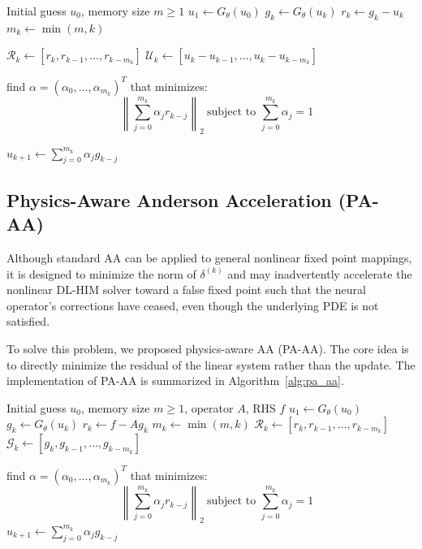 \documentclass[11pt]{article}
\begin{document}
\begin{algorithm}[h!]
    \caption{Standard AA for DL-HIM}
    \label{alg:aa}
    \begin{algorithmic}[1]
        \Require Initial guess $u_0$, memory size $m \ge 1$
        \State $u_1 \gets G_\theta(u_0)$
        \State $g_k \gets G_\theta(u_k)$
        \State $r_k \gets g_k - u_k$    
        \State $m_k \gets \min(m, k)$

        \State $\mathcal{R}_k \gets [r_k, r_{k-1}, \dots, r_{k-m_k}]$
        \State $\mathcal U_k \gets [u_k - u_{k-1}, \dots, u_k - u_{k-m_k}]$

        \State find $\alpha = (\alpha_0, \dots, \alpha_{m_k})^T$ that minimizes:
        $$
            \quad \left\| \sum_{j=0}^{m_k} \alpha_j r_{k-j} \right\|_2 \
            \text{subject to } \sum_{j=0}^{m_k} \alpha_j = 1
        $$

        \State $u_{k+1} \gets \sum_{j=0}^{m_k} \alpha_j g_{k-j}$
        \EndFor
    \end{algorithmic}
\end{algorithm}

\subsection{Physics-Aware Anderson Acceleration (PA-AA)}
Although standard AA can be applied to general nonlinear fixed point mappings, it is designed to minimize the norm of $\delta^{(k)}$ and may inadvertently accelerate the nonlinear DL-HIM solver toward a false fixed point such that the neural operator's corrections have ceased, even though the underlying PDE is not satisfied.

To solve this problem, we proposed physics-aware AA (PA-AA). The core idea is to directly minimize the residual of the linear system rather than the update. The implementation of PA-AA is summarized in Algorithm~\ref{alg:pa_aa}.
\begin{algorithm}[h!]
    \caption{PA-AA for DL-HIM}\label{alg:pa_aa}
    \begin{algorithmic}[1]
        \Require Initial guess $u_0$, memory size $m \ge 1$, operator $A$, RHS $f$
        \State $u_1 \gets G_\theta(u_0)$
        \State $g_k \gets G_\theta(u_k)$
        \State $r_k \gets f - A g_k$    
        \State $m_k \gets \min(m, k)$
        \State $\mathcal{R}_k \gets [r_k, r_{k-1},\dots, r_{k-m_k}]$
        \State $\mathcal{G}_k \gets [g_k, g_{k-1}, \dots, g_{k-m_k}]$

        \State find $\alpha = (\alpha_0, \dots, \alpha_{m_k})^T$ that minimizes:
        $$
            \quad \left\| \sum_{j=0}^{m_k} \alpha_j r_{k-j} \right\|_2 \
            \text{subject to } \sum_{j=0}^{m_k} \alpha_j = 1
        $$
        \State $u_{k+1} \gets \sum_{j=0}^{m_k} \alpha_j g_{k-j}$
        \EndFor
    \end{algorithmic}
\end{algorithm}
\end{document}
